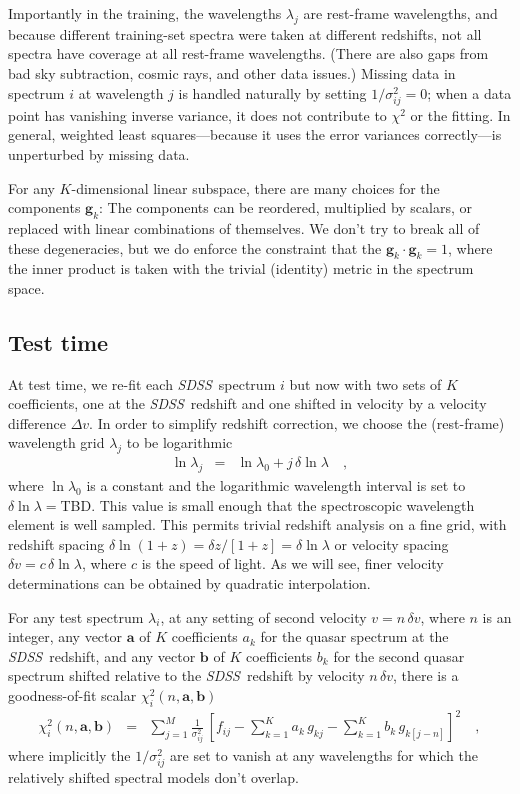 \documentclass[preprint]{aastex}
\newcommand{\project}[1]{\textsl{#1}}
\newcommand{\SDSS}{\project{SDSS}}
\newcommand{\mmatrix}[1]{\boldsymbol{#1}}
\newcommand{\avec}{\mmatrix{a}}
\newcommand{\bvec}{\mmatrix{b}}
\newcommand{\gvec}{\mmatrix{g}}
\begin{document}
Importantly in the training, the wavelengths $\lambda_j$ are
rest-frame wavelengths, and because different training-set spectra
were taken at different redshifts, not all spectra have coverage at
all rest-frame wavelengths.  (There are also gaps from bad sky
subtraction, cosmic rays, and other data issues.)  Missing data in
spectrum $i$ at wavelength $j$ is handled naturally by setting
$1/\sigma^2_{ij}=0$; when a data point has vanishing inverse
variance, it does not contribute to $\chi^2$ or the fitting.  In
general, weighted least squares---because it uses the error variances
correctly---is unperturbed by missing data.

For any $K$-dimensional linear subspace, there are many choices for
the components $\gvec_k$: The components can be reordered, multiplied
by scalars, or replaced with linear combinations of themselves.  We
don't try to break all of these degeneracies, but we do enforce the
constraint that the $\gvec_k\cdot\gvec_k=1$, where the inner product
is taken with the trivial (identity) metric in the spectrum space.

\subsection{Test time}

At test time, we re-fit each \SDSS\ spectrum $i$ but now with two sets
of $K$ coefficients, one at the \SDSS\ redshift and one shifted in
velocity by a velocity difference $\Delta v$.  In order to simplify
redshift correction, we choose the (rest-frame) wavelength grid
$\lambda_j$ to be logarithmic
\begin{eqnarray}\displaystyle
\ln\lambda_j &=& \ln\lambda_0 + j\,\delta\ln\lambda
\quad ,
\end{eqnarray}
where $\ln\lambda_0$ is a constant and the logarithmic wavelength
interval is set to $\delta\ln\lambda=$TBD.  This value is small enough
that the spectroscopic wavelength element is well sampled.  This
permits trivial redshift analysis on a fine grid, with redshift
spacing $\delta\ln(1+z)=\delta z/[1+z]=\delta\ln\lambda$ or velocity
spacing $\delta v=c\,\delta\ln\lambda$, where $c$ is the speed of
light.  As we will see, finer velocity determinations can be obtained
by quadratic interpolation.

For any test spectrum $\lambda_i$, at any setting of second velocity
$v= n\,\delta v$, where $n$ is an integer, any vector $\avec$ of $K$
coefficients $a_k$ for the quasar spectrum at the \SDSS\ redshift, and
any vector $\bvec$ of $K$ coefficients $b_k$ for the second quasar
spectrum shifted relative to the \SDSS\ redshift by velocity
$n\,\delta v$, there is a goodness-of-fit scalar
$\chi^2_i(n,\avec,\bvec)$
\begin{eqnarray}\displaystyle
\chi^2_i(n,\avec,\bvec) &=& \sum_{j=1}^{M} \frac{1}{\sigma^2_{ij}}
 \,\left[f_{ij} - \sum_{k=1}^K a_k\,g_{kj} - \sum_{k=1}^K b_k\,g_{k[j-n]}\right]^2
\quad,
\end{eqnarray}
where implicitly the $1/\sigma^2_{ij}$ are set to vanish at any
wavelengths for which the relatively shifted spectral models don't
overlap.
\end{document}
